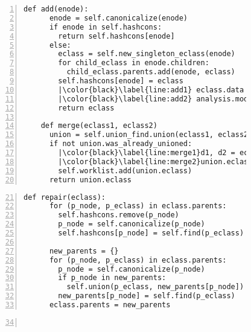 \begin{figure}
  \begin{minipage}[t]{0.47\linewidth}
    \begin{lstlisting}[gobble=4, numbers=left, numberstyle=\color{black}, basicstyle=\scriptsize\ttfamily\color{black!40}, escapechar=|]
    def add(enode):
      enode = self.canonicalize(enode)
      if enode in self.hashcons:
        return self.hashcons[enode]
      else:
        eclass = self.new_singleton_eclass(enode)
        for child_eclass in enode.children:
          child_eclass.parents.add(enode, eclass)
        self.hashcons[enode] = eclass
        |\color{black}\label{line:add1} eclass.data = analysis.make(enode)|
        |\color{black}\label{line:add2} analysis.modify(eclass)|
        return eclass

    def merge(eclass1, eclass2)
      union = self.union_find.union(eclass1, eclass2)
      if not union.was_already_unioned:
        |\color{black}\label{line:merge1}d1, d2 = eclass1.data, eclass2.data|
        |\color{black}\label{line:merge2}union.eclass.data = analysis.join(d1, d2)|
        self.worklist.add(union.eclass)
      return union.eclass
    \end{lstlisting}
  \end{minipage}
  \hfill
  \begin{minipage}[t]{0.47\linewidth}
    \begin{lstlisting}[gobble=4, numbers=left, firstnumber=21, numberstyle=\color{black}, basicstyle=\scriptsize\ttfamily\color{black!40}, escapechar=|]
    def repair(eclass):
      for (p_node, p_eclass) in eclass.parents:
        self.hashcons.remove(p_node)
        p_node = self.canonicalize(p_node)
        self.hashcons[p_node] = self.find(p_eclass)

      new_parents = {}
      for (p_node, p_eclass) in eclass.parents:
        p_node = self.canonicalize(p_node)
        if p_node in new_parents:
          self.union(p_eclass, new_parents[p_node])
        new_parents[p_node] = self.find(p_eclass)
      eclass.parents = new_parents
    \end{lstlisting}
    \vspace{-3mm}
    \begin{lstlisting}[gobble=4, numbers=left, firstnumber=34, basicstyle=\scriptsize\ttfamily, escapechar=|]


\end{lstlisting}
\end{minipage}
\end{figure}
